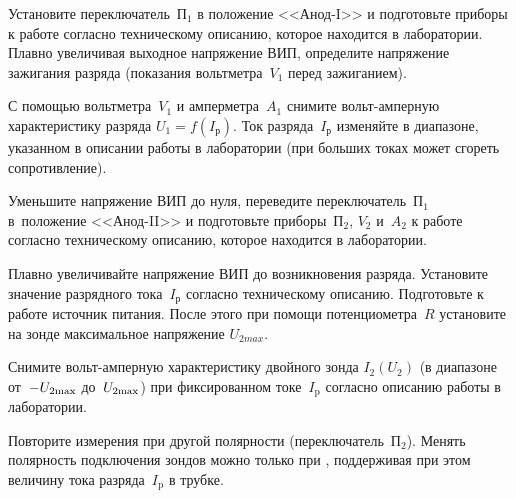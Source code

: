 \begin{lab:task}

    

\item Установите переключатель~$\text{П}_1$ в положение <<Анод-I>> и подготовьте
приборы к работе согласно техническому описанию, которое находится в
лаборатории. Плавно увеличивая выходное напряжение ВИП, определите напряжение
зажигания разряда (показания вольтметра~$V_{1}$ перед зажиганием).

\item С помощью вольтметра~$V_{1}$ и амперметра~$A_{1}$ снимите вольт-амперную
характеристику разряда $U_{1}=f(I_\text{р})$. Ток разряда~$I_\text{р}$ изменяйте
в диапазоне, указанном в описании работы в лаборатории (при больших токах может
сгореть сопротивление).


\item Уменьшите напряжение ВИП до нуля, переведите переключатель~$\text{П}_1$
в~положение <<Анод-II>> и подготовьте приборы~$\text{П}_{2}$, $V_{2}$ и~$A_{2}$
к работе согласно техническому описанию, которое находится в лаборатории.

\item Плавно увеличивайте напряжение ВИП до возникновения разряда. Установите
значение разрядного тока~$I_\text{р}$ согласно техническому описанию.
Подготовьте к работе источник питания. После этого при помощи
потенциометра~$R$ установите на зонде максимальное напряжение $U_{2 max}$.

\item Снимите вольт-амперную характеристику двойного зонда $I_{2}(U_{2})$
(в диапазоне от~$-U_{2 \rm max}$ до~$U_{2 \rm max}$) при фиксированном токе~$I_\text{p}$
согласно описанию работы в лаборатории.

\item Повторите измерения при другой полярности (переключатель~$\text{П}_2$).
Менять полярность подключения зондов можно только при ,
поддерживая при этом величину тока разряда~$I_\text{p}$ в трубке.


\end{lab:task}

